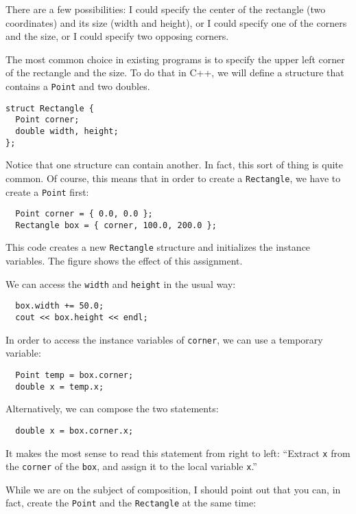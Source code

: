 There are a few possibilities: I could specify the center of
the rectangle (two coordinates) and its size (width and height),
or I could specify one of the corners and the size, or I
could specify two opposing corners.

The most common choice in existing programs is to specify the
upper left corner of the rectangle and the size.  To do that
in C++, we will define a structure that contains a {\tt Point}
and two doubles.

\begin{verbatim}
struct Rectangle {
  Point corner;
  double width, height;
};  
\end{verbatim}
%
Notice that one structure can contain another.  In fact, this
sort of thing is quite common.  Of course, this means that in
order to create a {\tt Rectangle}, we have to create a {\tt Point}
first:

\begin{verbatim}
  Point corner = { 0.0, 0.0 };
  Rectangle box = { corner, 100.0, 200.0 };
\end{verbatim}
%
This code creates a new {\tt Rectangle} structure and initializes the
instance variables.  The figure shows the effect of this assignment.

\vspace{0.1in}
\centerline{}
\vspace{0.1in}
%
We can access the {\tt width} and {\tt height} in the usual way:

\begin{verbatim}
  box.width += 50.0;
  cout << box.height << endl;
\end{verbatim}
%
In order to access the instance variables of {\tt corner}, we can use a
temporary variable:

\begin{verbatim}
  Point temp = box.corner;
  double x = temp.x;
\end{verbatim}
%
Alternatively, we can compose the two statements:


\begin{verbatim}
  double x = box.corner.x;
\end{verbatim}
%
It makes the most sense to read this statement from right to
left: ``Extract {\tt x} from the {\tt corner} of the {\tt box},
and assign it to the local variable {\tt x}.''

While we are on the subject of composition, I should point
out that you can, in fact, create the {\tt Point} and the
{\tt Rectangle} at the same time:

